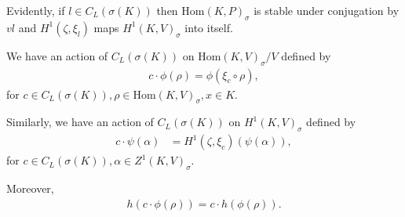 	Evidently, if $l \in C_L\left(\sigma(K)\right)$ then $\mathrm{Hom}(K, P)_\sigma$ is stable under conjugation by $vl$ and $H^1(\zeta, \xi_l)$ maps $H^1(K, V)_{\sigma}$ into itself.

	\begin{lemma}\label{lem:vcl} We have an action of $C_L(\sigma(K))$ on $\mathrm{Hom}(K, V)_\sigma / V$ defined by
		\begin{align} \label{vcl.hom}
			c \cdot \phi(\rho) = \phi\left(\xi_c \circ \rho \right),
		\end{align}
		for $c \in C_L(\sigma(K)), \rho \in \mathrm{Hom}(K, V)_\sigma, x \in K$.
		
		Similarly, we have an action of $C_L(\sigma(K))$ on $H^1(K, V)_\sigma$ defined by
		\begin{align} \label{cl.h1}
			c \cdot \psi(\alpha)
			&= H^1(\zeta, \xi_c)\left(\psi(\alpha)\right), 
		\end{align}
		for $c \in C_L(\sigma(K)), \alpha \in Z^1(K, V)_\sigma$.

	Moreover,
	\begin{align}\label{eqn:caction}
		h(c\cdot\phi(\rho)) = c \cdot h(\phi(\rho)).
	\end{align}
	\end{lemma}

